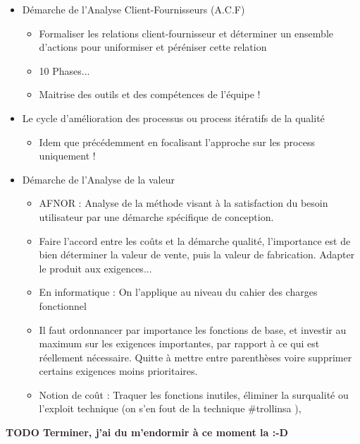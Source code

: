 \begin{itemize}
	\item Démarche de l’Analyse Client-Fournisseurs (A.C.F)
	\begin{itemize}
		\item Formaliser les relations client-fournisseur et déterminer un ensemble d'actions pour uniformiser et péréniser cette relation
		\item 10 Phases...
		\item  Maitrise des outils et des compétences de l’équipe !
	\end{itemize}


	\item Le cycle d’amélioration des processus ou process itératifs de la qualité
	\begin{itemize}
		\item Idem que précédemment en focalisant l’approche sur les process uniquement !
	\end{itemize}


	\item Démarche de l’Analyse de la valeur
	\begin{itemize}
		\item AFNOR : Analyse de la méthode visant à la satisfaction du besoin utilisateur par une démarche spécifique de conception.
		\item Faire l’accord entre les coûts et la démarche qualité, l’importance est de bien déterminer la valeur de vente, puis la valeur de fabrication. Adapter le produit aux exigences...
		\item En informatique : On l’applique au niveau du cahier des charges fonctionnel
		\item Il faut ordonnancer par importance les fonctions de base, et investir au maximum sur les exigences importantes, par rapport à ce qui est réellement nécessaire. Quitte à mettre entre parenthèses voire supprimer certains exigences moins prioritaires.
		\item Notion de coût : Traquer les fonctions inutiles, éliminer la surqualité ou l’exploit technique (on s’en fout de la technique \#trollinsa ),
	\end{itemize}

\end{itemize}

   
\textbf{TODO Terminer, j’ai du m’endormir à ce moment la :-D}
